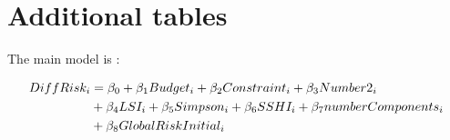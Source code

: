 \section{Additional tables}
\label{sec:appendix_reg}
The main model is : 

\begin{align}
\label{model:simple}
DiffRisk_{i} &= \beta_0 + \beta_1 Budget_i + \beta_2 Constraint_i + \beta_3 Number2_i \\
&+ \beta_4 LSI_i + \beta_5 Simpson_i + \beta_6 SSHI_i + \beta_7 numberComponents_i \notag \\
& + \beta_8 GlobalRiskInitial_i \notag
\end{align}

